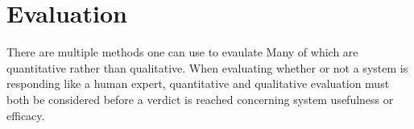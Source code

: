\section{Evaluation }

There are multiple methods one can use to evaulate 
Many of which are quantitative rather than qualitative.
When evaluating whether or not a system is responding like a human expert, quantitative and qualitative evaluation must both be considered before a verdict is reached concerning system usefulness or efficacy.

%